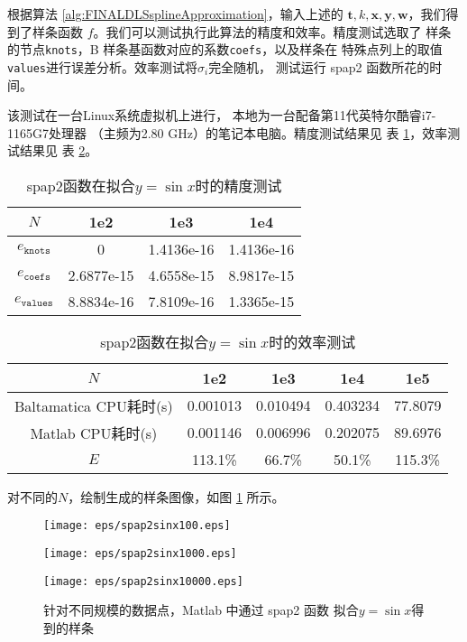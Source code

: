 根据算法 \ref{alg:FINALDLSsplineApproximation}，输入上述的
$\mathbf{t}, k, \mathbf{x}, \mathbf{y}, \mathbf{w}$，我们得到了样条函数
$f$。我们可以测试执行此算法的精度和效率。精度测试选取了
样条的节点\texttt{knots}，B 样条基函数对应的系数\texttt{coefs}，以及样条在
特殊点列上的取值\texttt{values}进行误差分析。效率测试将$\sigma_{i}$完全随机，
测试运行 spap2 函数所花的时间。

该测试在一台Linux系统虚拟机上进行，
本地为一台配备第11代英特尔酷睿i7-1165G7处理器
（主频为2.80 GHz）的笔记本电脑。精度测试结果见
表 \ref{tab:FINALspap2sinxacc}，效率测试结果见
表 \ref{tab:FINALspap2sinxtime}。

\begin{table}[htbp]
  \centering
  \caption{\label{tab:FINALspap2sinxacc}spap2函数在拟合$y=\sin x$时的精度测试}
  \begin{tabular}{cccc}
    \hline
    $N$& 1e2 & 1e3 & 1e4\\
    \hline
    $e_{\texttt{knots}}$&0& 1.4136e-16& 1.4136e-16\\
    $e_{\texttt{coefs}}$&2.6877e-15& 4.6558e-15&8.9817e-15\\
    $e_{\texttt{values}}$&8.8834e-16&7.8109e-16&1.3365e-15\\
    \hline
  \end{tabular}
\end{table}

\begin{table}[htbp]
  \centering
  \caption{\label{tab:FINALspap2sinxtime}spap2函数在拟合$y=\sin x$时的效率测试}
  \begin{tabular}{ccccc}
    \hline
    $N$&1e2&1e3&1e4&1e5\\
    \hline
    Baltamatica CPU耗时(s)&0.001013&0.010494&0.403234&77.8079\\
    Matlab CPU耗时(s)&0.001146&0.006996&0.202075&89.6976\\
    $E$&113.1\%&66.7\%&50.1\%&115.3\%\\
    \hline
  \end{tabular}
\end{table}

对不同的$N$，绘制生成的样条图像，如图 \ref{fig:FINALspap2sinx} 所示。

\begin{figure}[h]  
  \centering   
  \begin{minipage}{0.3\textwidth}  
    \centering  
    \texttt{[image: eps/spap2sinx100.eps]}  
    \caption*{$N=100$}  
  \end{minipage}  
  \hfill  
  \begin{minipage}{0.3\textwidth}  
    \centering  
    \texttt{[image: eps/spap2sinx1000.eps]}  
    \caption*{$N=1000$}  
  \end{minipage}
  \hfill  
  \begin{minipage}{0.3\textwidth}  
    \centering  
    \texttt{[image: eps/spap2sinx10000.eps]}  
    \caption*{$N=10000$}  
  \end{minipage}   
  \caption{针对不同规模的数据点，Matlab 中通过 spap2 函数
    拟合$y=\sin x$得到的样条}
  \label{fig:FINALspap2sinx}  
\end{figure}

